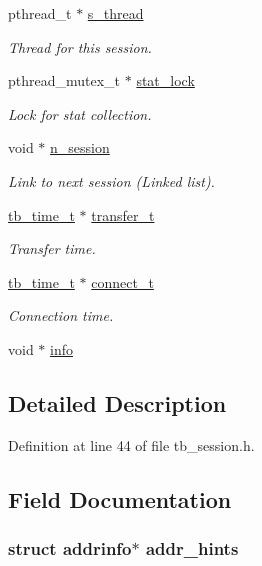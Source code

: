 \begin{DoxyCompactItemize}
pthread\-\_\-t $\ast$ \hyperlink{structtb__session__t_ae0b73c023bde38042a32ba345baca741}{s\-\_\-thread}
\begin{DoxyCompactList}\small\item\em Thread for this session. \end{DoxyCompactList}\item 
pthread\-\_\-mutex\-\_\-t $\ast$ \hyperlink{structtb__session__t_ab828bf6b1b85621025b518a892b79d79}{stat\-\_\-lock}
\begin{DoxyCompactList}\small\item\em Lock for stat collection. \end{DoxyCompactList}\item 
void $\ast$ \hyperlink{structtb__session__t_ae96f976543c2fbc18fd89a368720f4d4}{n\-\_\-session}
\begin{DoxyCompactList}\small\item\em Link to next session (Linked list). \end{DoxyCompactList}\item 
\hyperlink{structtb__time__t}{tb\-\_\-time\-\_\-t} $\ast$ \hyperlink{structtb__session__t_a0cb6fc264a37771e927fe0b383fc600c}{transfer\-\_\-t}
\begin{DoxyCompactList}\small\item\em Transfer time. \end{DoxyCompactList}\item 
\hyperlink{structtb__time__t}{tb\-\_\-time\-\_\-t} $\ast$ \hyperlink{structtb__session__t_a49678949e63fd3a8335bac2bfa9d9ff2}{connect\-\_\-t}
\begin{DoxyCompactList}\small\item\em Connection time. \end{DoxyCompactList}\item 
void $\ast$ \hyperlink{structtb__session__t_acb1df3a0f703b05bc4971f79cabe2597}{info}
\end{DoxyCompactItemize}


\subsection{Detailed Description}


Definition at line 44 of file tb\-\_\-session.\-h.



\subsection{Field Documentation}
\hypertarget{structtb__session__t_a105521cb94384edeaace1a1ce7b3d7c7}{
\subsubsection[{addr\-\_\-hints}]{\setlength{\rightskip}{0pt plus 5cm}struct addrinfo$\ast$ addr\-\_\-hints}}\label{structtb__session__t_a105521cb94384edeaace1a1ce7b3d7c7}


